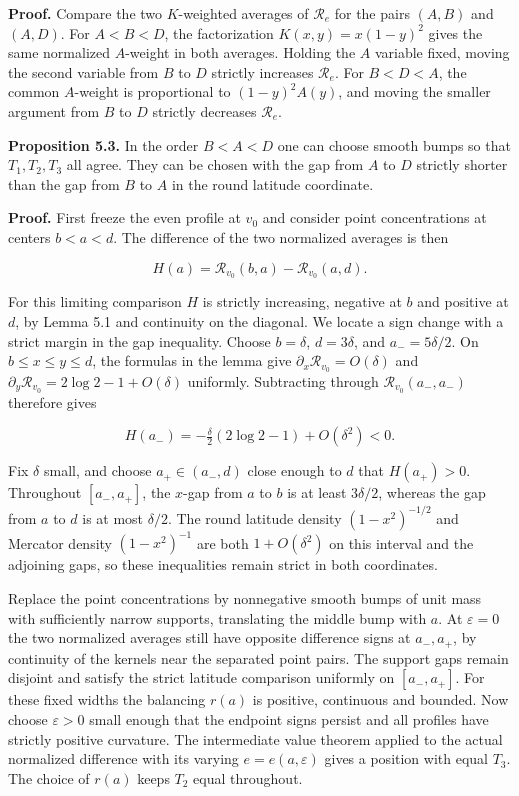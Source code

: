 \documentclass[11pt,letterpaper]{article}
\begin{document}
\textbf{Proof.} Compare the two \(K\)-weighted averages of \(\mathcal R_e\) for the pairs
\((A,B)\) and \((A,D)\). For \(A<B<D\), the factorization \(K(x,y)=x(1-y)^2\) gives the same
normalized \(A\)-weight in both averages. Holding the \(A\) variable fixed, moving the
second variable from \(B\) to \(D\) strictly increases \(\mathcal R_e\). For \(B<D<A\), the
common \(A\)-weight is proportional to \((1-y)^2 A(y)\), and moving the smaller argument
from \(B\) to \(D\) strictly decreases \(\mathcal R_e\).

\textbf{Proposition 5.3.} In the order \(B<A<D\) one can choose smooth bumps so that
\(T_1,T_2,T_3\) all agree. They can be chosen with the gap from \(A\) to \(D\) strictly
shorter than the gap from \(B\) to \(A\) in the round latitude coordinate.

\textbf{Proof.} First freeze the even profile at \(v_0\) and consider point concentrations
at centers \(b<a<d\). The difference of the two normalized averages is then

\[H(a)=\mathcal R_{v_0}(b,a)-\mathcal R_{v_0}(a,d).\]

For this limiting comparison \(H\) is strictly increasing, negative at \(b\) and positive at
\(d\), by Lemma 5.1 and continuity on the diagonal. We locate a sign change with a strict
margin in the gap inequality. Choose \(b=\delta\), \(d=3\delta\), and \(a_-=5\delta/2\). On
\(b\le x\le y\le d\), the formulas in the lemma give
\(\partial_x\mathcal R_{v_0}=O(\delta)\) and
\(\partial_y\mathcal R_{v_0}=2\log 2-1+O(\delta)\) uniformly. Subtracting through
\(\mathcal R_{v_0}(a_-,a_-)\) therefore gives

\[H(a_-)=-\tfrac{\delta}{2}(2\log 2-1)+O(\delta^2)<0.\]

Fix \(\delta\) small, and choose \(a_+\in(a_-,d)\) close enough to \(d\) that \(H(a_+)>0\).
Throughout \([a_-,a_+]\), the \(x\)-gap from \(a\) to \(b\) is at least \(3\delta/2\),
whereas the gap from \(a\) to \(d\) is at most \(\delta/2\). The round latitude density
\((1-x^2)^{-1/2}\) and Mercator density \((1-x^2)^{-1}\) are both \(1+O(\delta^2)\) on this
interval and the adjoining gaps, so these inequalities remain strict in both coordinates.

Replace the point concentrations by nonnegative smooth bumps of unit mass with sufficiently
narrow supports, translating the middle bump with \(a\). At \(\varepsilon=0\) the two
normalized averages still have opposite difference signs at \(a_-,a_+\), by continuity of
the kernels near the separated point pairs. The support gaps remain disjoint and satisfy the
strict latitude comparison uniformly on \([a_-,a_+]\). For these fixed widths the balancing
\(r(a)\) is positive, continuous and bounded. Now choose \(\varepsilon>0\) small enough that
the endpoint signs persist and all profiles have strictly positive curvature. The
intermediate value theorem applied to the actual normalized difference with its varying
\(e=e(a,\varepsilon)\) gives a position with equal \(T_3\). The choice of \(r(a)\) keeps
\(T_2\) equal throughout.
\end{document}
